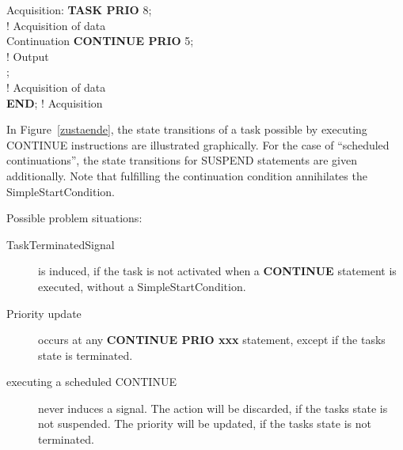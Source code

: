 \begin{tabbing}
Acquisition: \= {\bf TASK PRIO} 8;\\
      \> \x \x ! Acquisition of data\\
      \>  Continuation {\bf CONTINUE PRIO} 5;\\
      \> \x \x ! Output\\
      \> ;\\
      \> \x \x ! Acquisition of data\\
      \> {\bf END}; ! Acquisition
\end{tabbing}

In Figure~\ref{zustaende},
the state transitions of a task possible by executing CONTINUE
instructions are illustrated graphically. For the case of
``scheduled continuations'', the state transitions for SUSPEND statements are
given additionally.
Note that fulfilling the continuation condition annihilates the
SimpleStartCondition.

Possible problem situations:
\begin{description}
\item[TaskTerminatedSignal] is induced, if the task is not activated when 
a {\bf CONTINUE} statement is executed, without a SimpleStartCondition.
\item[Priority update] occurs at any {\bf CONTINUE PRIO xxx} statement,
 except if the tasks state is terminated.
\item[executing a scheduled CONTINUE] never induces a signal. The action will
   be discarded, if the tasks state is not suspended. The priority will be 
   updated, if the tasks state is not terminated.
\end{description}


